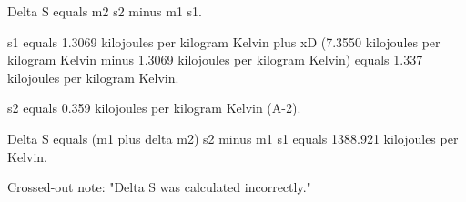 Delta S equals m2 s2 minus m1 s1.  

s1 equals 1.3069 kilojoules per kilogram Kelvin plus xD (7.3550 kilojoules per kilogram Kelvin minus 1.3069 kilojoules per kilogram Kelvin) equals 1.337 kilojoules per kilogram Kelvin.  

s2 equals 0.359 kilojoules per kilogram Kelvin (A-2).  

Delta S equals (m1 plus delta m2) s2 minus m1 s1 equals 1388.921 kilojoules per Kelvin.  

Crossed-out note: "Delta S was calculated incorrectly."